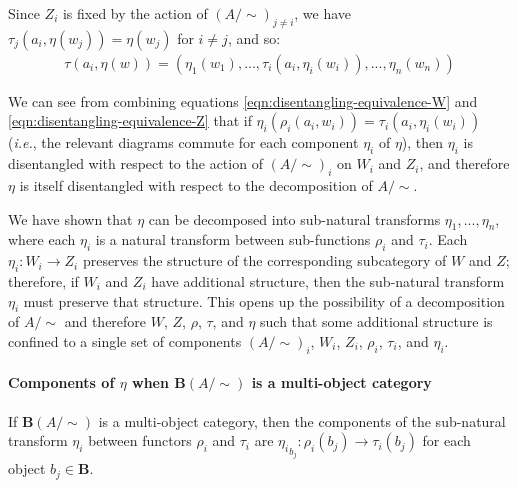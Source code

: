 Since $Z_{i}$ is fixed by the action of $(A/\sim)_{j \neq i}$, we have $\tau_{j}(a_{i}, \eta(w_{j})) = \eta(w_{j})$ for $i \neq j$, and so:
\begin{align}
    \tau(a_{i}, \eta(w)) = (\eta_{1}(w_{1}),..., \tau_{i}(a_{i}, \eta_{i}(w_{i})), ..., \eta_{n}(w_{n}))
    \label{eqn:disentangling-equivalence-Z}
\end{align}

We can see from combining equations \ref{eqn:disentangling-equivalence-W} and \ref{eqn:disentangling-equivalence-Z} that if $\eta_{i}(\rho_{i}(a_{i}, w_{i})) = \tau_{i}(a_{i}, \eta_{i}(w_{i}))$ (\textit{i.e.}, the relevant diagrams commute for each component $\eta_{i}$ of $\eta$), then $\eta_{i}$ is disentangled with respect to the action of $(A/\sim)_{i}$ on $W_{i}$ and $Z_{i}$, and therefore $\eta$ is itself disentangled with respect to the decomposition of $A/\sim$.

We have shown that $\eta$ can be decomposed into sub-natural transforms $\eta_{1}, ..., \eta_{n}$, where each $\eta_{i}$ is a natural transform between sub-functions $\rho_{i}$ and $\tau_{i}$.
Each $\eta_{i}: W_{i} \to Z_{i}$ preserves the structure of the corresponding subcategory of $W$ and $Z$; therefore, if $W_{i}$ and $Z_{i}$ have additional structure, then the sub-natural transform $\eta_{i}$ must preserve that structure.
This opens up the possibility of a decomposition of $A/\sim$ and therefore $W$, $Z$, $\rho$, $\tau$, and $\eta$ such that some additional structure is confined to a single set of components $(A/\sim)_{i}$, $W_{i}$, $Z_{i}$, $\rho_{i}$, $\tau_{i}$, and $\eta_{i}$.

\paragraph{Components of $\eta$ when $\textbf{B}(A/\sim)$ is a multi-object category}

If $\textbf{B}(A/\sim)$ is a multi-object category, then the components of the sub-natural transform $\eta_{i}$ between functors $\rho_{i}$ and $\tau_{i}$ are ${\eta_{i}}_{b_{j}}: \rho_{i}(b_{j}) \to \tau_{i}(b_{j})$ for each object $b_{j} \in \textbf{B}$.




